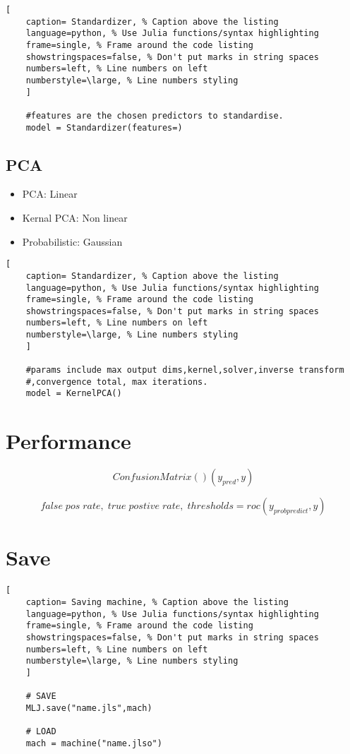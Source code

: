 \documentclass[11pt]{scrartcl} %
\begin{document}
\begin{lstlisting}[
	caption= Standardizer, % Caption above the listing
	language=python, % Use Julia functions/syntax highlighting
	frame=single, % Frame around the code listing
	showstringspaces=false, % Don't put marks in string spaces
	numbers=left, % Line numbers on left
	numberstyle=\large, % Line numbers styling
	]

	#features are the chosen predictors to standardise.
	model = Standardizer(features=)

\end{lstlisting}

\subsection{PCA}

\begin{itemize}
	\item PCA: Linear
	\item Kernal PCA: Non linear
	\item Probabilistic: Gaussian 
\end{itemize}

\begin{lstlisting}[
	caption= Standardizer, % Caption above the listing
	language=python, % Use Julia functions/syntax highlighting
	frame=single, % Frame around the code listing
	showstringspaces=false, % Don't put marks in string spaces
	numbers=left, % Line numbers on left
	numberstyle=\large, % Line numbers styling
	]

	#params include max output dims,kernel,solver,inverse transform
	#,convergence total, max iterations.
	model = KernelPCA()

\end{lstlisting}


\section{Performance}

\[ConfusionMatrix()(y_{pred},y)\]

\[ false\;pos\;rate,\; true\; postive\; rate,\; thresholds = roc(y_{probpredict},y) \]

\section{Save}

\begin{lstlisting}[
	caption= Saving machine, % Caption above the listing
	language=python, % Use Julia functions/syntax highlighting
	frame=single, % Frame around the code listing
	showstringspaces=false, % Don't put marks in string spaces
	numbers=left, % Line numbers on left
	numberstyle=\large, % Line numbers styling
	]

	# SAVE
	MLJ.save("name.jls",mach)

	# LOAD
	mach = machine("name.jlso")

\end{lstlisting}
\end{document}
